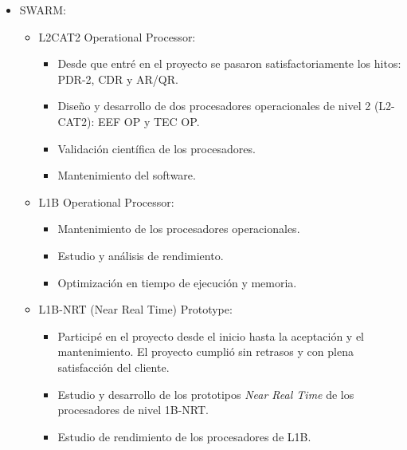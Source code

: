 \documentclass[11pt,a4paper,sans]{moderncv}
\begin{document}
{\begin{itemize}
\begin{itemize}
                    software.
            \end{itemize}
        \item SWARM:
            \begin{itemize}
                \item L2CAT2 Operational Processor:
                    \begin{itemize}
                        \item Desde que entré en el proyecto se pasaron satisfactoriamente los
                            hitos: PDR-2, CDR y AR/QR.
                        \item Diseño y desarrollo de dos procesadores operacionales de nivel 2
                            (L2-CAT2): EEF OP y TEC OP.
                        \item Validación científica de los procesadores.
                        \item Mantenimiento del software.
                    \end{itemize}
                \item L1B Operational Processor:
                    \begin{itemize}
                        \item Mantenimiento de los procesadores operacionales.
                        \item Estudio y análisis de rendimiento.
                        \item Optimización en tiempo de ejecución y memoria.
                    \end{itemize}
                \item L1B-NRT (Near Real Time) Prototype:
                    \begin{itemize}
                        \item Participé en el proyecto desde el inicio hasta la aceptación y el
                            mantenimiento. El proyecto cumplió sin retrasos y con plena satisfacción
                            del cliente.
                        \item Estudio y desarrollo de los prototipos \emph{Near Real Time} de los
                            procesadores de nivel 1B-NRT.
                        \item Estudio de rendimiento de los procesadores de L1B.
                    \end{itemize}
            \end{itemize}
    \end{itemize}}
\end{document}
